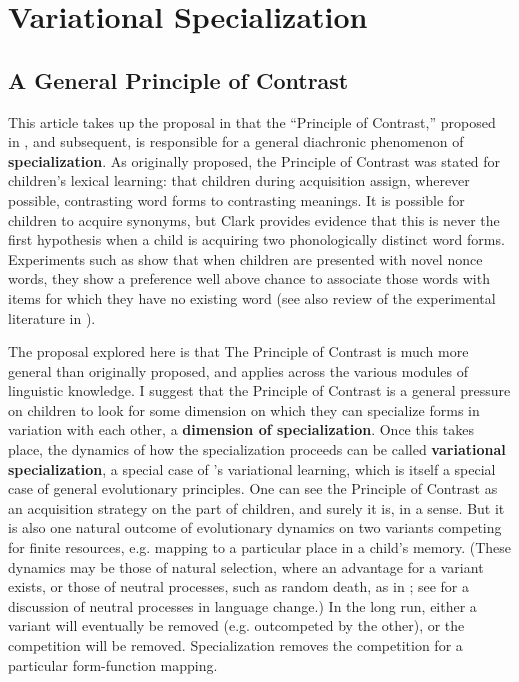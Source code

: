 \documentclass{artikel3}
\begin{document}
\section{Variational Specialization}

\subsection{A General Principle of Contrast}


This article takes up the proposal in \citet{fruehwaldwallenberginprep} that the ``Principle of Contrast,'' proposed in \citet{clark1987, clark1990}, and subsequent, is responsible for a general diachronic phenomenon of \textbf{specialization}. As originally proposed, the Principle of Contrast was stated for children's lexical learning: that children during acquisition assign, wherever possible, contrasting word forms to contrasting meanings. It is possible for children to acquire synonyms, but Clark provides evidence that this is never the first hypothesis when a child is acquiring two phonologically distinct word forms. Experiments such as \citet{markmanwachtel1988} show that when children are presented with novel nonce words, they show a preference well above chance to associate those words with items for which they have no existing word (see also review of the experimental literature in \citealt{bionetal2013}). 

The proposal explored here is that The Principle of Contrast is much more general than originally proposed, and applies across the various modules of linguistic knowledge. I suggest that the Principle of Contrast is a general pressure on children to look for some dimension on which they can specialize forms in variation with each other, a \textbf{dimension of specialization}. Once this takes place, the dynamics of how the specialization proceeds can be called \textbf{variational specialization}, a special case of \citet{yang2000, yang2002}'s variational learning, which is itself a special case of general evolutionary principles. One can see the Principle of Contrast as an acquisition strategy on the part of children, and surely it is, in a sense. But it is also one natural outcome of evolutionary dynamics on two variants competing for finite resources, e.g. mapping to a particular place in a child's memory. (These dynamics may be those of natural selection, where an advantage for a variant exists, or those of neutral processes, such as random death, as in \citealt{moran1958}; see \citealt{kauhanen2016} for a discussion of neutral processes in language change.) In the long run, either a variant will eventually be removed (e.g. outcompeted by the other), or the competition will be removed. Specialization removes the competition for a particular form-function mapping.
\end{document}
